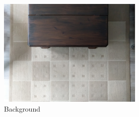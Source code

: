 \begin{figure}[]
\begin{subfigure}{\textwidth}
        \begin{subfigure}{0.2\textwidth}
            \centering
            \includegraphics[width=\textwidth]{images/04-experiment02/carpet/bg.jpg}
            \caption*{Background}
        \end{subfigure}
        \hfill
        \begin{subfigure}{0.78\textwidth}
            \centering
            \begin{subfigure}{0.32\textwidth}
                \centering
\end{subfigure}
\end{subfigure}
\end{subfigure}
\end{figure}
